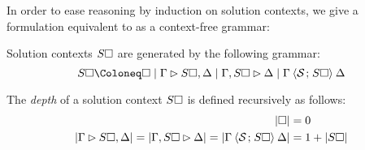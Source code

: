 In order to ease reasoning by induction on solution contexts, we give a
formulation equivalent to  as a context-free grammar:
\begin{fact}
  Solution contexts $S\square$ are generated by the following grammar:
  $$
    S\hole \Coloneq \hole \mid \Gamma \J S\hole, \Delta
                          \mid \Gamma, S\hole \J \Delta
                          \mid \Gamma \piq{\mathcal{S} \sep S\hole} \Delta
  $$
\end{fact}

\begin{definition}
The \emph{depth} of a solution context $S\square$ is defined recursively as
follows:
\begin{align*}
  \left|\square\right| &= 0 \\
  \left|\Gamma \mathbin{\rhd} S\square, \Delta\right| = \left|\Gamma, S\square \mathbin{\rhd} \Delta\right| =
  \left|\Gamma \mathbin{\langle \mathcal{S} \;\!;\!\; S\square \rangle} \Delta\right| &= 1 + \left|S\square\right|
\end{align*}
\end{definition}


